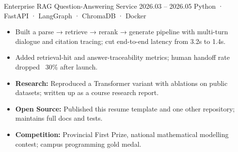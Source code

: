 {\cvproject
{Enterprise RAG Question-Answering Service}
{2026.03 -- 2026.05}
{Python · FastAPI · LangGraph · ChromaDB · Docker}
{}{}
\begin{itemize}
  \item Built a parse → retrieve → rerank → generate pipeline with multi-turn dialogue and citation tracing; cut end-to-end latency from 3.2s to 1.4s.
  \item Added retrieval-hit and answer-traceability metrics; human handoff rate dropped ~30\% after launch.
\end{itemize}


\begin{itemize}
  \item \textbf{Research:} Reproduced a Transformer variant with ablations on public datasets; written up as a course research report.
  \item \textbf{Open Source:} Published this resume template and one other repository; maintains full docs and tests.
  \item \textbf{Competition:} Provincial First Prize, national mathematical modelling contest; campus programming gold medal.
\end{itemize}


}
